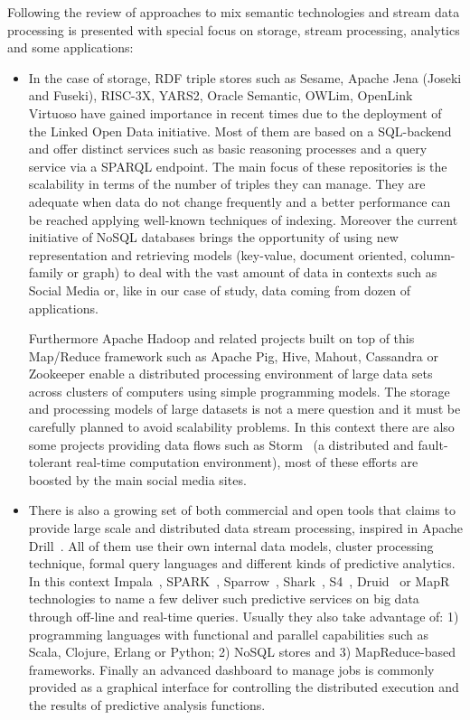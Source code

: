 Following the review of approaches to mix semantic technologies and stream data processing is 
presented with special focus on storage, stream processing, analytics and some applications:
\begin{itemize}
 \item In the case of storage, RDF triple stores such as Sesame, Apache Jena 
(Joseki and Fuseki), RISC-3X, YARS2, Oracle Semantic, OWLim, OpenLink Virtuoso have gained 
importance in recent times due to the deployment of the Linked Open Data initiative. 
Most of them are based on a SQL-backend and offer distinct services such as basic reasoning processes 
and a query service via a SPARQL endpoint. The main focus of these repositories is the scalability 
in terms of the number of triples they can manage. They are adequate when data do not 
change frequently and a better performance can be reached applying well-known 
techniques of indexing. Moreover the current initiative of NoSQL databases brings the opportunity 
of using new representation and retrieving models (key-value, document oriented, column-family or graph) 
to deal with the vast amount of data in contexts such as Social Media or, like in our case of study, 
data coming from dozen of applications.

Furthermore Apache Hadoop and related projects built on top of this Map/Reduce framework 
such as Apache Pig, Hive, Mahout, Cassandra or Zookeeper enable a distributed processing environment 
of large data sets across clusters of computers using simple programming models. The storage and 
processing models of large datasets is not a mere question and it must be carefully planned to avoid 
scalability problems. In this context there are also some projects providing 
data flows such as Storm~\cite{BigDataManing} (a distributed and fault-tolerant real-time 
computation environment), most of these efforts are boosted by the main 
social media sites. 

\item There is also a growing set of both commercial and open tools that 
claims to provide large scale and distributed data stream processing, inspired in Apache Drill~\cite{hausenblas2013apache}. 
All of them use their own internal data models, cluster processing technique, formal query languages and different kinds of 
predictive analytics. In this context Impala~\cite{impala-project}, SPARK~\cite{zaharia2012discretized}, Sparrow~\cite{ousterhout2013sparrow},
Shark~\cite{DBLP:conf/sigmod/XinRZFSS13}, S4~\cite{neumeyer2010s4}, Druid~\cite{yangdruid} or MapR~\cite{mapr-project} technologies to name a 
few deliver such predictive services on big data through off-line and real-time queries. Usually they also take advantage 
of: 1) programming languages with functional and parallel capabilities such as Scala, Clojure, Erlang or Python; 
2) NoSQL stores and 3) MapReduce-based frameworks. Finally an advanced dashboard to manage jobs is 
commonly provided as a graphical interface for controlling the distributed execution and the results of predictive 
analysis functions.



\end{itemize}
